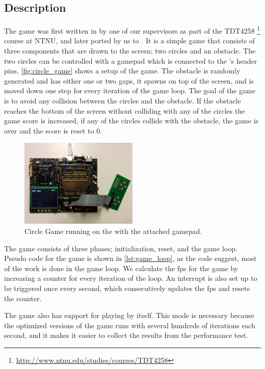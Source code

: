 \subsection{Description}

The game was first written in {\C} by one of our supervisors as part of the TDT4258 \footnote{\url{http://www.ntnu.edu/studies/courses/TDT4258}} course at NTNU, and later ported by us to {\rust}.
It is a simple game that consists of three components that are drawn to the screen; two circles and an obstacle.
The two circles can be controlled with a gamepad which is connected to the {\DK}'s header pins, \autoref{fig:circle_game} shows a setup of the game.
The obstacle is randomly generated and has either one or two gaps, it spawns on top of the screen, and is moved down one step for every iteration of the game loop.
The goal of the game is to avoid any collision between the circles and the obstacle.
If the obstacle reaches the bottom of the screen without colliding with any of the circles the game score is increased, if any of the circles collide with the obstacle, the game is over and the score is reset to 0.

\begin{figure}[H]
  \centering
  \includegraphics[width=0.5\textwidth]{figures/circle-game.jpg}
  \caption{Circle Game running on the {\DK} with the attached gamepad.}
  \label{fig:circle_game}
\end{figure}

The game consists of three phases; initialization, reset, and the game loop.
Pseudo code for the game is shown in \autoref{lst:game_loop}, as the code suggest, most of the work is done in the game loop.
We calculate the \gls{fps} for the game by increasing a counter for every iteration of the loop.
An interrupt is also set up to be triggered once every second, which consecutively updates the \gls{fps} and resets the counter.

The game also has support for playing by itself.
This mode is necessary because the optimized versions of the game runs with several hundreds of iterations each second, and it makes it easier to collect the results from the performance test.


